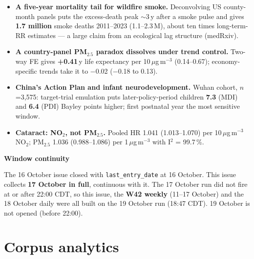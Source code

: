 \documentclass[10pt]{article}
\begin{document}
\footnotesize
\begin{itemize}

\item \textbf{A five-year mortality tail for wildfire smoke.} Deconvolving US county-month panels puts the excess-death
peak $\sim$3\,y after a smoke pulse and gives \textbf{1.7 million} smoke deaths 2011--2023 (1.1--2.3\,M), about ten
times long-term-RR estimates --- a large claim from an ecological lag structure (medRxiv).

\item \textbf{A country-panel PM$_{2.5}$ paradox dissolves under trend control.} Two-way FE gives \textbf{+0.41}\,y life
expectancy per 10\,$\mu$g\,m$^{-3}$ (0.14--0.67); economy-specific trends take it to $-$0.02 ($-$0.18 to 0.13).

\item \textbf{China's Action Plan and infant neurodevelopment.} Wuhan cohort, $n$=3,575: target-trial emulation puts
later-policy-period children \textbf{7.3} (MDI) and \textbf{6.4} (PDI) Bayley points higher; first postnatal year
the most sensitive window.

\item \textbf{Cataract: NO$_2$, not PM$_{2.5}$.} Pooled HR 1.041 (1.013--1.070) per 10\,$\mu$g\,m$^{-3}$ NO$_2$; PM$_{2.5}$
1.036 (0.988--1.086) per 1\,$\mu$g\,m$^{-3}$ with I$^2$ = 99.7\,\%.

\end{itemize}

\vspace{2mm}

\begin{keybox}
{\sffamily\bfseries\footnotesize\color{Deep}Window continuity}\\[1.2mm]
{\fontsize{7.2}{8.8}\selectfont
The 16 October issue closed with \texttt{last\_entry\_date} at 16 October. This issue collects
\textbf{17 October in full}, continuous with it. The 17 October run did not fire at or after 22:00 CDT, so this
issue, the \textbf{W42 weekly} (11--17 October) and the 18 October daily were all built on the 19 October run
(18:47 CDT). 19 October is not opened (before 22:00).\par}
\end{keybox}

\vspace{3mm}
\par{}\baselineskip{}\baselineskip
\section*{\sffamily\bfseries\color{Deep}Corpus analytics}
\vspace{-1.5mm}{\color{Amber}\rule{\linewidth}{1.1pt}}\vspace{2.5mm}
\end{document}
